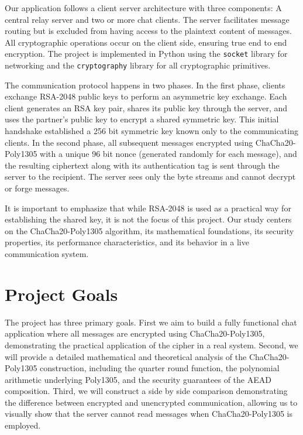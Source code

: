 \documentclass[12pt]{article}
\begin{document}
    Our application follows a client server architecture with three components: A central relay server and two or more chat clients. The server facilitates message routing but is excluded from having access to the plaintext content of messages. All cryptographic operations occur on the client side, ensuring true end to end encryption. The project is implemented in Python using the \texttt{socket} library for networking and the \texttt{cryptography} library for all cryptographic primitives. 

    The communication protocol happens in two phases. In the first phase, clients exchange RSA-2048 public keys to perform an asymmetric key exchange. Each client generates an RSA key pair, shares its public key through the server, and uses the partner's public key to encrypt a shared symmetric key. This initial handshake established a 256 bit symmetric key known only to the communicating clients. In the second phase, all subsequent messages encrypted using ChaCha20-Poly1305 with a unique 96 bit nonce (generated randomly for each message), and the resulting ciphertext along with its authentication tag is sent through the server to the recipient. The server sees only the byte streams and cannot decrypt or forge messages.

    It is important to emphasize that while RSA-2048 is used as a practical way for establishing the shared key, it is not the focus of this project. Our study centers on the ChaCha20-Poly1305 algorithm, its mathematical foundations, its security properties, its performance characteristics, and its behavior in a live communication system.

\section{Project Goals}

    The project has three primary goals. First we aim to build a fully functional chat application where all messages are encrypted using ChaCha20-Poly1305, demonstrating the practical application of the cipher in a real system. Second, we will provide a detailed mathematical and theoretical analysis of the ChaCha20-Poly1305 construction, including the quarter round function, the polynomial arithmetic underlying Poly1305, and the security guarantees of the AEAD composition. Third, we will construct a side by side comparison demonstrating the difference between encrypted and unencrypted communication, allowing us to visually show that the server cannot read messages when ChaCha20-Poly1305 is employed.
\end{document}
